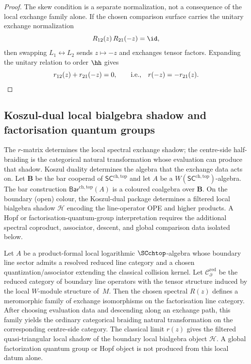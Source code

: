 \begin{proof}
The skew condition is a separate normalization, not a consequence of
the local exchange family alone.  If the chosen comparison surface
carries the unitary exchange normalization
\[
R_{12}(z)\,R_{21}(-z)=\id ,
\]
then swapping $L_1 \leftrightarrow L_2$ sends \(z\mapsto -z\) and
exchanges tensor factors.  Expanding the unitary relation to order
\(\hh\) gives
\[
r_{12}(z) + r_{21}(-z) = 0, \qquad\text{i.e.,}\quad r(-z) = -r_{21}(z). \qedhere
\]
\end{proof}

\subsection{Koszul-dual local bialgebra shadow and factorisation quantum
groups}
\label{subsec:Hopf}
The $r$-matrix determines the local spectral exchange shadow; the centre-side half-braiding is the categorical natural transformation whose evaluation can produce that shadow. Koszul duality determines the algebra that the exchange data acts on. Let $\mathbf B$ be the bar cooperad of $\mathsf{SC}^{\mathrm{ch,top}}$ and let $A$ be a $W(\mathsf{SC}^{\mathrm{ch,top}})$-algebra.
The bar construction $\mathsf{Bar}^{\mathrm{ch,top}}(A)$ is a
coloured coalgebra over $\mathbf B$. On the boundary (open) colour, the
Koszul-dual package determines a filtered local bialgebra shadow
\(\mathcal H\) encoding the line-operator OPE and higher products.  A
Hopf or factorisation-quantum-group interpretation requires the
additional spectral coproduct, associator, descent, and global
comparison data isolated below.

\begin{theorem}
\label{thm:braided-category}
Let $A$ be a product-formal local logarithmic $\SCchtop$-algebra whose
boundary line sector admits a resolved reduced line category and a
chosen quantization/associator extending the classical collision
kernel. Let $\mathcal C_{\partial}^{\mathrm{red}}$ be the reduced
category of boundary line operators with the tensor structure induced
by the local $W$-module structure of~$M$. Then the chosen spectral
$R(z)$ defines a meromorphic family of exchange isomorphisms on the
factorisation line category. After choosing evaluation data and
descending along an exchange path, this family yields the ordinary
categorical braiding natural transformation on the corresponding
centre-side category. The classical limit $r(z)$ gives the filtered
quasi-triangular local shadow of the boundary local bialgebra object
$\mathcal H$. A global factorization quantum group or Hopf object is
not produced from this local datum alone.
\end{theorem}

